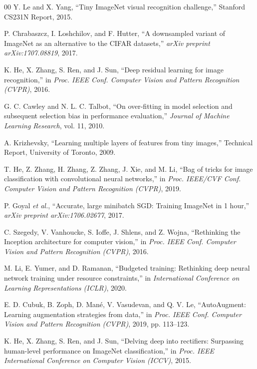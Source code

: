 \documentclass[conference]{IEEEtran}
\begin{document}
\begin{thebibliography}{00}
Y. Le and X. Yang, ``Tiny ImageNet visual recognition challenge,'' Stanford CS231N Report, 2015.

P. Chrabaszcz, I. Loshchilov, and F. Hutter, ``A downsampled variant of ImageNet as an alternative to the CIFAR datasets,'' \textit{arXiv preprint arXiv:1707.08819}, 2017.

K. He, X. Zhang, S. Ren, and J. Sun, ``Deep residual learning for image recognition,'' in \textit{Proc. IEEE Conf. Computer Vision and Pattern Recognition (CVPR)}, 2016.

G. C. Cawley and N. L. C. Talbot, ``On over-fitting in model selection and subsequent selection bias in performance evaluation,'' \textit{Journal of Machine Learning Research}, vol. 11, 2010.

A. Krizhevsky, ``Learning multiple layers of features from tiny images,'' Technical Report, University of Toronto, 2009.

T. He, Z. Zhang, H. Zhang, Z. Zhang, J. Xie, and M. Li, ``Bag of tricks for image classification with convolutional neural networks,'' in \textit{Proc. IEEE/CVF Conf. Computer Vision and Pattern Recognition (CVPR)}, 2019.

P. Goyal \textit{et al.}, ``Accurate, large minibatch SGD: Training ImageNet in 1 hour,'' \textit{arXiv preprint arXiv:1706.02677}, 2017.

C. Szegedy, V. Vanhoucke, S. Ioffe, J. Shlens, and Z. Wojna, ``Rethinking the Inception architecture for computer vision,'' in \textit{Proc. IEEE Conf. Computer Vision and Pattern Recognition (CVPR)}, 2016.

M. Li, E. Yumer, and D. Ramanan, ``Budgeted training: Rethinking deep neural network training under resource constraints,'' in \textit{International Conference on Learning Representations (ICLR)}, 2020.

E. D. Cubuk, B. Zoph, D. Mané, V. Vasudevan, and Q. V. Le, ``AutoAugment: Learning augmentation strategies from data,'' in \textit{Proc. IEEE Conf. Computer Vision and Pattern Recognition (CVPR)}, 2019, pp. 113--123.

K. He, X. Zhang, S. Ren, and J. Sun, ``Delving deep into rectifiers: Surpassing human-level performance on ImageNet classification,'' in \textit{Proc. IEEE International Conference on Computer Vision (ICCV)}, 2015.


\end{thebibliography}
\end{document}
